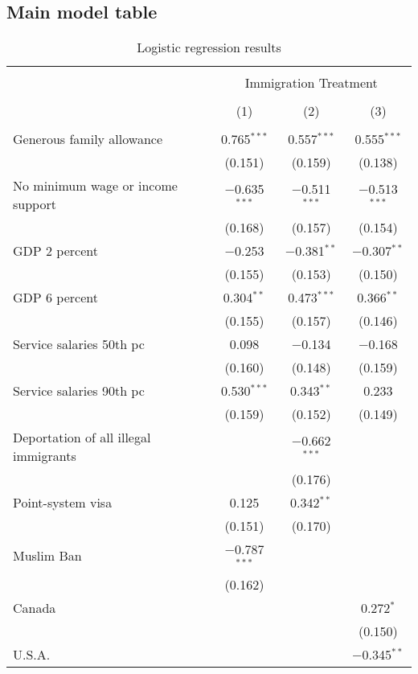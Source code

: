 \documentclass[12pt]{article}
\begin{document}
\begin{appendices}
\section{Main model table}
\clearpage

\begin{table}[H] \centering 
  \caption{Logistic regression results} 
  \label{tab:results} 
\begin{tabular}{@{\extracolsep{5pt}}lccc} 
\\[-1.8ex]\hline 
\hline \\[-1.8ex] 
 & \multicolumn{3}{c}{Immigration Treatment} \\ 
\cline{2-4} 
\\[-1.8ex] & (1) & (2) & (3)\\ 
\hline \\[-1.8ex] 
 Generous family allowance & 0.765$^{***}$ & 0.557$^{***}$ & 0.555$^{***}$ \\ 
  & (0.151) & (0.159) & (0.138) \\ 
  No minimum wage or income support & $-$0.635$^{***}$ & $-$0.511$^{***}$ & $-$0.513$^{***}$ \\ 
  & (0.168) & (0.157) & (0.154) \\ 
  GDP 2 percent & $-$0.253 & $-$0.381$^{**}$ & $-$0.307$^{**}$ \\ 
  & (0.155) & (0.153) & (0.150) \\ 
  GDP 6 percent & 0.304$^{**}$ & 0.473$^{***}$ & 0.366$^{**}$ \\ 
  & (0.155) & (0.157) & (0.146) \\ 
  Service salaries 50th pc & 0.098 & $-$0.134 & $-$0.168 \\ 
  & (0.160) & (0.148) & (0.159) \\ 
  Service salaries 90th pc & 0.530$^{***}$ & 0.343$^{**}$ & 0.233 \\ 
  & (0.159) & (0.152) & (0.149) \\ 
  Deportation of all illegal immigrants &  & $-$0.662$^{***}$ &  \\ 
  &  & (0.176) &  \\ 
  Point-system visa & 0.125 & 0.342$^{**}$ &  \\ 
  & (0.151) & (0.170) &  \\ 
  Muslim Ban & $-$0.787$^{***}$ &  &  \\ 
  & (0.162) &  &  \\ 
  Canada &  &  & 0.272$^{*}$ \\ 
  &  &  & (0.150) \\ 
  U.S.A. &  &  & $-$0.345$^{**}$ \\ 

\end{tabular}
\end{table}
\end{appendices}
\end{document}
